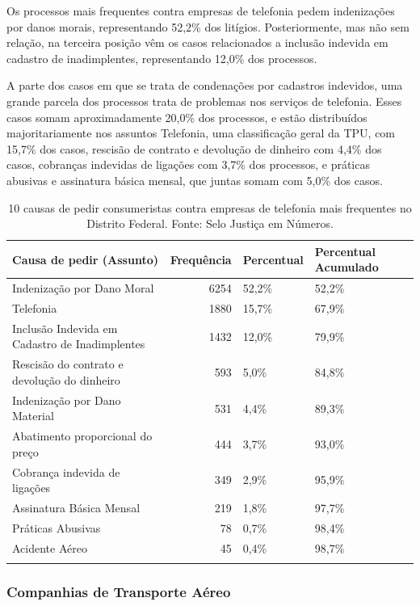 \documentclass[]{report}
\begin{document}
Os processos mais frequentes contra empresas de telefonia pedem
indenizações por danos morais, representando 52,2\% dos litígios.
Posteriormente, mas não sem relação, na terceira posição vêm os casos
relacionados a inclusão indevida em cadastro de inadimplentes,
representando 12,0\% dos processos.

A parte dos casos em que se trata de condenações por cadastros
indevidos, uma grande parcela dos processos trata de problemas nos
serviços de telefonia. Esses casos somam aproximadamente 20,0\% dos
processos, e estão distribuídos majoritariamente nos assuntos Telefonia,
uma classificação geral da TPU, com 15,7\% dos casos, rescisão de
contrato e devolução de dinheiro com 4,4\% dos casos, cobranças
indevidas de ligações com 3,7\% dos processos, e práticas abusivas e
assinatura básica mensal, que juntas somam com 5,0\% dos casos.

\begin{longtable}{lrll}
\caption{10 causas de pedir consumeristas contra empresas de telefonia mais frequentes no Distrito Federal. Fonte: Selo Justiça em Números.} \\
  \hline
Causa de pedir (Assunto) & Frequência & Percentual & Percentual Acumulado \\
  \hline
Indenização por Dano Moral & 6254 & 52,2\% & 52,2\% \\
  Telefonia & 1880 & 15,7\% & 67,9\% \\
  Inclusão Indevida em Cadastro de Inadimplentes & 1432 & 12,0\% & 79,9\% \\
  Rescisão do contrato e devolução do dinheiro & 593 & 5,0\% & 84,8\% \\
  Indenização por Dano Material & 531 & 4,4\% & 89,3\% \\
  Abatimento proporcional do preço & 444 & 3,7\% & 93,0\% \\
  Cobrança indevida de ligações & 349 & 2,9\% & 95,9\% \\
  Assinatura Básica Mensal & 219 & 1,8\% & 97,7\% \\
  Práticas Abusivas &  78 & 0,7\% & 98,4\% \\
  Acidente Aéreo &  45 & 0,4\% & 98,7\% \\
   \hline
\hline
\label{unnamed-chunk-60}
\end{longtable}

\subsubsection{Companhias de Transporte
Aéreo}\label{companhias-de-transporte-aereo}
\end{document}
